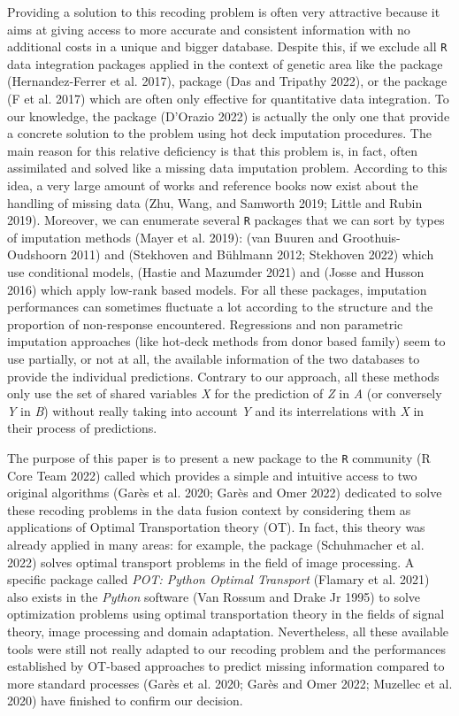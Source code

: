Providing a solution to this recoding problem is often very attractive because it aims at giving access to more accurate and consistent information with no additional costs in a unique and bigger database. Despite this, if we exclude all \texttt{R} data integration packages applied in the context of genetic area like the  package (Hernandez-Ferrer et al. 2017),  package (Das and Tripathy 2022), or the  package (F et al. 2017) which are often only effective for quantitative data integration. To our knowledge, the  package (D'Orazio 2022) is actually the only one that provide a concrete solution to the problem using hot deck imputation procedures. The main reason for this relative deficiency is that this problem is, in fact, often assimilated and solved like a missing data imputation problem. According to this idea, a very large amount of works and reference books now exist about the handling of missing data (Zhu, Wang, and Samworth 2019; Little and Rubin 2019). Moreover, we can enumerate several \texttt{R} packages that we can sort by types of imputation methods (Mayer et al. 2019):  (van Buuren and Groothuis-Oudshoorn 2011) and  (Stekhoven and Bühlmann 2012; Stekhoven 2022) which use conditional models,  (Hastie and Mazumder 2021) and  (Josse and Husson 2016) which apply low-rank based models. For all these packages, imputation performances can sometimes fluctuate a lot according to the structure and the proportion of non-response encountered. Regressions and non parametric imputation approaches (like hot-deck methods from donor based family) seem to use partially, or not at all, the available information of the two databases to provide the individual predictions. Contrary to our approach, all these methods only use the set of shared variables \emph{X} for the prediction of \emph{Z} in \emph{A} (or conversely \emph{Y} in \emph{B}) without really taking into account \emph{Y} and its interrelations with \emph{X} in their process of predictions.

The purpose of this paper is to present a new package to the \texttt{R} community (R Core Team 2022) called  which provides a simple and intuitive access to two original algorithms (Garès et al. 2020; Garès and Omer 2022) dedicated to solve these recoding problems in the data fusion context by considering them as applications of Optimal Transportation theory (OT). In fact, this theory was already applied in many areas: for example, the  package (Schuhmacher et al. 2022) solves optimal transport problems in the field of image processing. A specific package called \emph{POT: Python Optimal Transport} (Flamary et al. 2021) also exists in the \emph{Python} software (Van Rossum and Drake Jr 1995) to solve optimization problems using optimal transportation theory in the fields of signal theory, image processing and domain adaptation. Nevertheless, all these available tools were still not really adapted to our recoding problem and the performances established by OT-based approaches to predict missing information compared to more standard processes (Garès et al. 2020; Garès and Omer 2022; Muzellec et al. 2020) have finished to confirm our decision.

